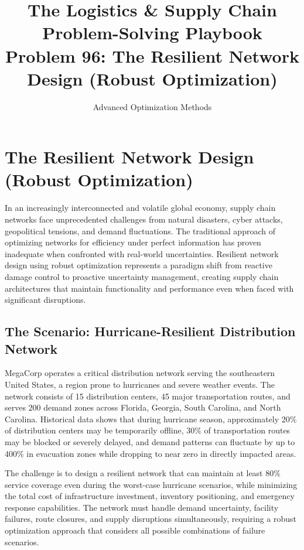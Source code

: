 \documentclass{article}
\title{The Logistics \& Supply Chain Problem-Solving Playbook\\
Problem 96: The Resilient Network Design (Robust Optimization)}
\author{Advanced Optimization Methods}
\date{}
\begin{document}
\maketitle

\section{The Resilient Network Design (Robust Optimization)}

In an increasingly interconnected and volatile global economy, supply chain networks face unprecedented challenges from natural disasters, cyber attacks, geopolitical tensions, and demand fluctuations. The traditional approach of optimizing networks for efficiency under perfect information has proven inadequate when confronted with real-world uncertainties. Resilient network design using robust optimization represents a paradigm shift from reactive damage control to proactive uncertainty management, creating supply chain architectures that maintain functionality and performance even when faced with significant disruptions.

\subsection{The Scenario: Hurricane-Resilient Distribution Network}

MegaCorp operates a critical distribution network serving the southeastern United States, a region prone to hurricanes and severe weather events. The network consists of 15 distribution centers, 45 major transportation routes, and serves 200 demand zones across Florida, Georgia, South Carolina, and North Carolina. Historical data shows that during hurricane season, approximately 20\% of distribution centers may be temporarily offline, 30\% of transportation routes may be blocked or severely delayed, and demand patterns can fluctuate by up to 400\% in evacuation zones while dropping to near zero in directly impacted areas.

The challenge is to design a resilient network that can maintain at least 80\% service coverage even during the worst-case hurricane scenarios, while minimizing the total cost of infrastructure investment, inventory positioning, and emergency response capabilities. The network must handle demand uncertainty, facility failures, route closures, and supply disruptions simultaneously, requiring a robust optimization approach that considers all possible combinations of failure scenarios.
\end{document}
